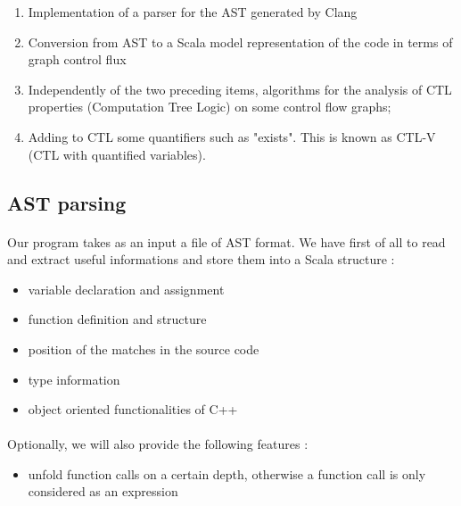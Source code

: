 \documentclass{report}
\begin{document}
\begin{enumerate}
        \item Implementation of a parser for the AST generated by Clang
        \item Conversion from AST to a Scala model representation of the code in terms of graph control flux
        \item Independently of the two preceding items, algorithms for the analysis of CTL properties (Computation Tree Logic) on some control flow graphs;
        \item Adding to CTL some quantifiers such as "exists". This is known as CTL-V (CTL with quantified variables).
    \end{enumerate}
\subsection{AST parsing}

\paragraph{}
\hspace{4mm}\textnormal{Our program takes as an input a file of AST format. We have first of all to read and extract useful informations and store them into a Scala structure :}

\vspace{3mm}
\begin{itemize}
\item variable declaration and assignment\vspace{1mm}
\item function definition and structure\vspace{1mm}
\item position of the matches in the source code\vspace{1mm}
\item type information\vspace{1mm}
\item object oriented functionalities of C++\vspace{1mm}
\end{itemize}

\paragraph{}
\hspace{4mm}\textnormal{Optionally, we will also provide the following features  :}

\vspace{3mm}
\begin{itemize}
\item unfold function calls on a certain depth, otherwise a function call is only considered as an expression\vspace{1mm}
\end{itemize}
\end{document}
